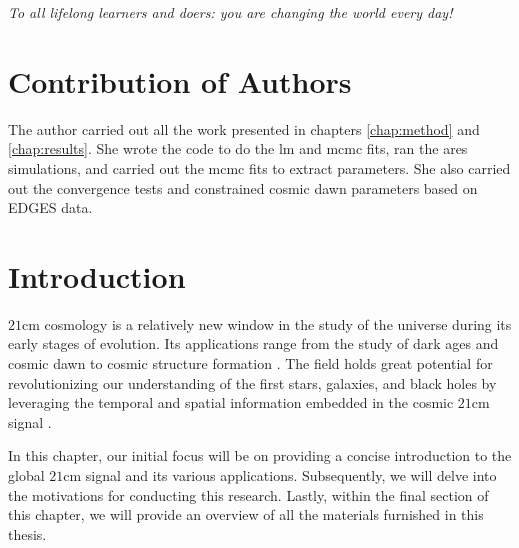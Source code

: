 \documentclass[12pt, TexShade, letterpaper]{report}
\begin{document}
\emph{To all lifelong learners and doers: you are changing the world every day!}
 \chapter*{Contribution of Authors}
	\label{chap:contribution}
The author carried out all the work presented in chapters \ref{chap:method} and \ref{chap:results}. She wrote the code to do the \gls{lm} and \gls{mcmc} fits, ran the \gls{ares} simulations, and carried out the \gls{mcmc} fits to extract parameters.  She also carried out the convergence tests and constrained cosmic dawn parameters based on EDGES data.\par
 
	\tableofcontents\thispagestyle{plain}
 \glsunsetall
	\listoffigures\thispagestyle{plain}
 \glsresetall
 \glsunsetall
	\listoftables
  \glsresetall
	\glsaddall
	\setlength\LTleft{0pt}
	\setlength\LTright{0pt}
	\setlength\glsdescwidth{0.8\hsize}
	\printglossary[title={List of Acronyms}]

 	\clearpage
	
	\glsresetall
\chapter{Introduction}
\label{chap:intro}
$\mathrm{21cm}$ cosmology is a relatively new window in the study of the universe during its early stages of evolution. Its applications range from the study of dark ages and cosmic dawn to cosmic structure formation \cite{SKA_dark_ages}. The field holds great potential for revolutionizing our understanding of the first stars, galaxies, and black holes by leveraging the temporal and spatial information embedded in the cosmic $\mathrm{21cm}$ signal \cite{21cmfast_c}.\par

In this chapter, our initial focus will be on providing a concise introduction to the global $\mathrm{21cm}$ signal and its various applications. Subsequently, we will delve into the motivations for conducting this research. Lastly, within the final section of this chapter, we will provide an overview of all the materials furnished in this thesis.\par
\end{document}

